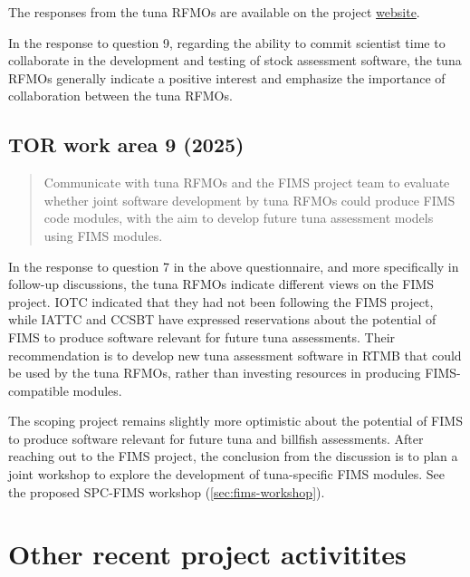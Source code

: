 \documentclass{SCreport}
\newcommand\tree
{https://github.com/PacificCommunity/ofp-sam-transition-plan/tree/main}
\begin{document}
\vspace{2ex}

The responses from the tuna RFMOs are available on the project
\href{\tree/notes/rfmo_discussion/feedback}{website}.

In the response to question 9, regarding the ability to commit scientist time to
collaborate in the development and testing of stock assessment software, the
tuna RFMOs generally indicate a positive interest and emphasize the importance
of collaboration between the tuna RFMOs.

\vspace{2ex}

\hypertarget{link:tor-9}{}
\subsection{TOR work area 9 (2025)}
\label{sec:tor-9}

\begin{quote}\sf
  Communicate with tuna RFMOs and the FIMS project team to evaluate whether
  joint software development by tuna RFMOs could produce FIMS code modules, with
  the aim to develop future tuna assessment models using FIMS modules.
\end{quote}

\vspace{2ex}

In the response to question 7 in the above questionnaire, and more specifically
in follow-up discussions, the tuna RFMOs indicate different views on the FIMS
project. IOTC indicated that they had not been following the FIMS project, while
IATTC and CCSBT have expressed reservations about the potential of FIMS to
produce software relevant for future tuna assessments. Their recommendation is
to develop new tuna assessment software in RTMB that could be used by the tuna
RFMOs, rather than investing resources in producing FIMS-compatible modules.

The scoping project remains slightly more optimistic about the potential of FIMS
to produce software relevant for future tuna and billfish assessments. After
reaching out to the FIMS project, the conclusion from the discussion is to plan
a joint workshop to explore the development of tuna-specific FIMS modules. See
the proposed SPC-FIMS workshop (\autoref{sec:fims-workshop}).

\vspace{2ex}

\section{Other recent project activitites}
\end{document}

